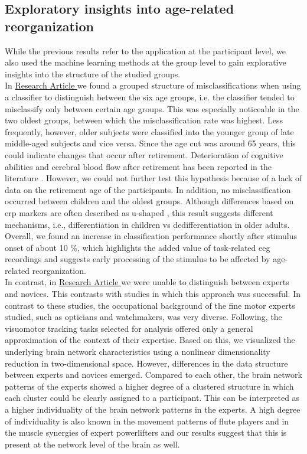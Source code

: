 \subsection{Exploratory insights into age-related reorganization}
While the previous results refer to the application at the participant level, we also used the machine learning methods at the group level to gain explorative insights into the structure of the studied groups.\\
In \hyperref[results:paperII]{Research Article } we found a grouped structure of misclassifications when using a classifier to distinguish between the six age groups, i.e. the classifier tended to misclassify only between certain age groups. This was especially noticeable in the two oldest groups, between which the misclassification rate was highest. Less frequently, however, older subjects were classified into the younger group of late middle-aged subjects and vice versa. Since the age cut was around 65 years, this could indicate changes that occur after retirement. Deterioration of cognitive abilities and cerebral blood flow after retirement has been reported in the literature \cite{Celidoni2017, Rohwedder2010, Rogers1990}. However, we could not further test this hypothesis because of a lack of data on the retirement age of the participants. In addition, no misclassification occurred between children and the oldest groups. Although differences based on \gls{erp} markers are often described as u-shaped \cite{Mueller2008, Reuter2019}, this result suggests different mechanisms, i.e., differentiation in children vs dedifferentiation in older adults. Overall, we found an increase in classification performance shortly after stimulus onset of about 10 \%, which highlights the added value of task-related \gls{eeg} recordings and suggests early processing of the stimulus to be affected by age-related reorganization.\\
In contrast, in \hyperref[results:paperIV]{Research Article } we were unable to distinguish between experts and novices. This contrasts with studies in which this approach was successful. In contrast to these studies, the occupational background of the fine motor experts studied, such as opticians and watchmakers, was very diverse. Following, the visuomotor tracking tasks selected for analysis offered only a general approximation of the context of their expertise. Based on this, we visualized the underlying brain network characteristics using a nonlinear dimensionality reduction in two-dimensional space. However, differences in the data structure between experts and novices emerged. Compared to each other, the brain network patterns of the experts showed a higher degree of a clustered structure in which each cluster could be clearly assigned to a participant. This can be interpreted as a higher individuality of the brain network patterns in the experts. A high degree of individuality is also known in the movement patterns of flute players and in the muscle synergies of expert powerlifters \cite{Albrecht2014, Caramiaux2018, Kristiansen2015} and our results suggest that this is present at the network level of the brain as well.\\
